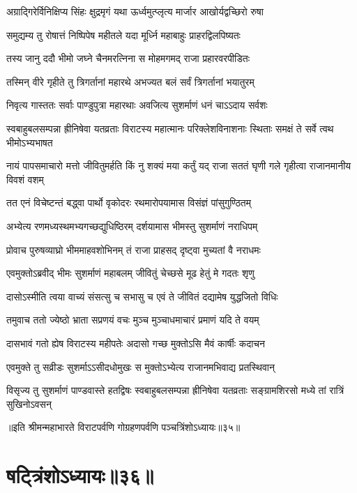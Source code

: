 \twolineshloka
{अग्राद्गिरेर्विनिक्षिप्य सिंहः क्षुद्रमृगं यथा}
{ऊर्ध्वमुत्प्लृत्य मार्जार आखोर्यद्वच्छिरो रुषा}


\twolineshloka
{समुद्यम्य तु रोषात्तं निष्पिपेष महीतले}
{यदा मूर्ध्नि महाबाहुः प्राहरद्विलपिष्यतः}


\twolineshloka
{तस्य जानु ददौ भीमो जघ्ने चैनमरत्निना}
{स मोहमगमद् राजा प्रहारवरपीडितः}


\twolineshloka
{तस्मिन् वीरे गृहीते तु त्रिगर्तानां महारथे}
{अभज्यत बलं सर्वं त्रिगर्तानां भयातुरम्}


\twolineshloka
{निवृत्य गास्ततः सर्वाः पाण्डुपुत्रा महारथाः}
{अवजित्य सुशर्माणं धनं चाऽऽदाय सर्वशः}


\threelineshloka
{स्वबाहुबलसम्पन्ना ह्रीनिषेवा यतव्रताः}
{विराटस्य महात्मानः परिक्लेशविनाशनाः}
{स्थिताः समक्षं ते सर्वे त्वथ भीमोऽभ्यभाषत}


\threelineshloka
{नायं पापसमाचारो मत्तो जीवितुमर्हति}
{किं नु शक्यं मया कर्तुं यद् राजा सततं घृणी}
{गले गृहीत्वा राजानमानीय विवशं वशम्}


\twolineshloka
{तत एनं विचेष्टन्तं बद्ध्वा पार्थो वृकोदरः}
{रथमारोपयामास विसंज्ञं पांसुगुण्ठितम्}


\twolineshloka
{अभ्येत्य रणमध्यस्थमभ्यगच्छद्युधिष्ठिरम्}
{दर्शयामास भीमस्तु सुशर्माणं नराधिपम्}


\twolineshloka
{प्रोवाच पुरुषव्याघ्रो भीममाहवशोभिनम्}
{तं राजा प्राहसद् दृष्ट्वा मुच्यतां वै नराधमः}


\twolineshloka
{एवमुक्तोऽब्रवीद् भीमः सुशर्माणं महाबलम्}
{जीवितुं चेच्छसे मूढ हेतुं मे गदतः शृणु}


\twolineshloka
{दासोऽस्मीति त्वया वाच्यं संसत्सु च सभासु च}
{एवं ते जीवितं दद्यामेष युद्धजितो विधिः}


\twolineshloka
{तमुवाच ततो ज्येष्ठो भ्राता सप्रणयं वचः}
{मुञ्च मुञ्चाधमाचारं प्रमाणं यदि ते वयम्}


\twolineshloka
{दासभावं गतो ह्येष विराटस्य महीपतेः}
{अदासो गच्छ मुक्तोऽसि मैवं कार्षीः कदाचन}


\twolineshloka
{एवमुक्ते तु सव्रीडः सुशर्माऽऽसीदधोमुखः}
{स मुक्तोऽभ्येत्य राजानमभिवाद्य प्रतस्थिवान्}


\threelineshloka
{विसृज्य तु सुशर्माणं पाण्डवास्ते हतद्विषः}
{स्वबाहुबलसम्पन्ना ह्रीनिषेवा यतव्रताः}
{सङ्ग्रामशिरसो मध्ये तां रात्रिं सुखिनोऽवसन्}

॥इति श्रीमन्महाभारते विराटपर्वणि गोग्रहणपर्वणि पञ्चत्रिंशोऽध्यायः॥३५॥

\chapter{षट्त्रिंशोऽध्यायः॥३६॥}

